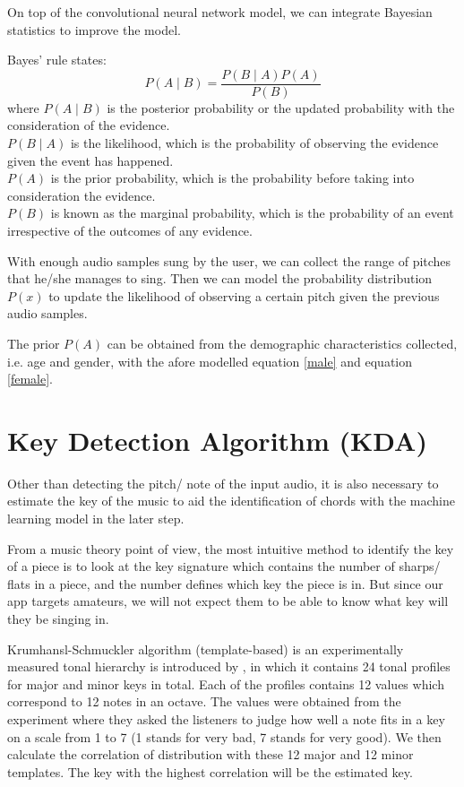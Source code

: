 On top of the convolutional neural network model, we can integrate Bayesian statistics to improve the model.

Bayes' rule states: 
\[P(A\mid B)=\frac {P(B\mid A)P(A)}{P(B)}\]
where $P(A\mid B)$ is the posterior probability or the updated probability with the consideration of the evidence.\\
$P(B\mid A)$ is the likelihood, which is the probability of observing the evidence given the event has happened.\\
$P(A)$ is the prior probability, which is the probability before taking into consideration the evidence.\\
$P(B)$ is known as the marginal probability, which is the probability of an event irrespective of the outcomes of any evidence.

With enough audio samples sung by the user, we can collect the range of pitches that he/she manages to sing. Then we can model 
the probability distribution $P(x)$ to update the likelihood of observing a certain pitch given the previous audio samples.

The prior $P(A)$ can be obtained from the demographic characteristics collected, i.e. age and gender, with the afore modelled equation
\ref{male} and equation \ref{female}.

\section{Key Detection Algorithm (KDA)}
\label{sec:KDA}
Other than detecting the pitch/ note of the input audio, it is also necessary to estimate the key of the music to aid the identification
of chords with the machine learning model in the later step.

From a music theory point of view, the most intuitive method to identify the key of a piece is to look at the key signature which contains the number of sharps/ flats
in a piece, and the number defines which key the piece is in. But since our app targets amateurs, we will not expect them to be able to know what key will they be singing
in.

Krumhansl-Schmuckler algorithm (template-based)  is an experimentally measured tonal hierarchy is introduced by \cite{templatedata}, in which it contains 
24 tonal profiles for major and minor keys in total.
Each of the profiles contains 12 values which correspond to 12 notes in an octave. The values were obtained from the experiment where they asked the listeners to judge how well
a note fits in a key on a scale from 1 to 7 (1 stands for very bad, 7 stands for very good). We then calculate the correlation of distribution with these 12 major and 12 minor
templates. The key with the highest correlation will be the estimated key.

